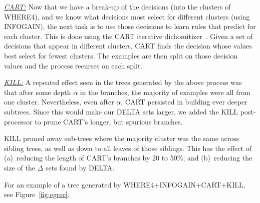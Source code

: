 \documentclass[runningheads]{llncs}
\newcommand{\be}{\begin{enumerate}}
\newcommand{\ee}{\end{enumerate}}
\newcommand{\fig}[1]{Figure~\ref{fig:#1}}
\begin{document}
\underline{{\em CART:}} Now that we have a break-up 
of the decisions (into the clusters of WHERE4),
and we know what decisions most select for different clusters (using INFOGAIN),
the next task is to use those decisions to learn rules that predict for each cluster.
This is done using the CART iterative dichomitizer~\cite{breiman84}. 
Given a set
of decisions that appear in different clusters, CART finds the decision
whose values best select for fewest clusters. The examples
are then split on those decision values and the process recurses
on each split. 

\underline{{\em KILL:}} A repeated effect seen in
the trees generated by the above process was that
after some depth $\alpha$ in the branches, the
majority of examples were all from one
cluster. Nevertheless, even after $\alpha$, CART
persisted in building ever deeper subtrees. Since this would make
our DELTA sets larger, we added the KILL post-processor to prune
CART's longer, but spurious branches. 

KILL pruned away sub-trees
where the majority cluster was the same across sibling trees,
as well as down to all leaves of those siblings. This has  the 
effect of
(a)~reducing the length of CART's branches by 20 to 50\%;
and (b)~reducing the size of the $\Delta$ sets found by DELTA.

For an example of a tree generated by WHERE4+INFOGAIN+CART+KILL,
see \fig{egree}.

\end{document}
